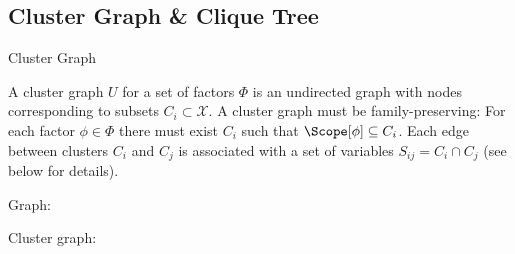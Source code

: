 \subsection{Cluster Graph \& Clique Tree}

\begin{frame}{Cluster Graph}
\begin{definition}
   A cluster graph $U$ for a set of factors $\Phi$ is an undirected graph with nodes corresponding to subsets $C_i \subset \mathcal{X}$.
   A cluster graph must be family-preserving: For each factor $\phi \in \Phi$ there must exist $C_i$ such that $\Scope[\phi] \subseteq C_i$. 
   Each edge between clusters $C_i$ and $C_j$ is associated with a set of variables $S_{ij} = C_i \cap C_j$ (see below for details).
\end{definition}
\pause
\begin{example}
    \begin{minipage}[t]{0.24\textwidth}
\begin{center}
    Graph:
\end{center}
\end{minipage}
\pause
\hfill\vrule\hfill
    \begin{minipage}[t]{0.24\textwidth}
\begin{center}
    Cluster graph:
\end{center}
\end{minipage}
\end{example}
\end{frame}
